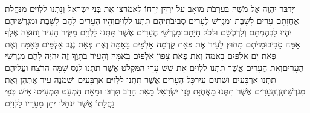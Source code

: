 \documentclass[../main/main.tex]{subfiles}
\begin{document}
\begin{multicols*}{\ncols}
וַיְדַבֵּר יַהְוֶה אֶל מֹשֶׁה בְּעַרְבֹת מוֹאָב עַל יַרְדֵּן יְרֵחוֹ לֵאמֹר\PreVerseSpace{}צַו אֶת בְּנֵי יִשְׂרָאֵל וְנָתְנוּ לַלְוִיִּם מִנַּחֲלַת אֲחֻזָּתָם עָרִים לָשָׁבֶת וּמִגְרָשׁ לֶעָרִים סְבִיבֹתֵיהֶם תִּתְּנוּ לַלְוִיִּם\PreVerseSpace{}וְהָיוּ הֶעָרִים לָהֶם לָשָׁבֶת וּמִגְרְשֵׁיהֶם יִהְיוּ לִבְהֶמְתָּם וְלִרְכֻשָׁם וּלְכֹל חַיָּתָם\PreVerseSpace{}וּמִגְרְשֵׁי הֶעָרִים אֲשֶׁר תִּתְּנוּ לַלְוִיִּם מִקִּיר הָעִיר וָחוּצָה אֶלֶף אַמָּה סָבִיב\PreVerseSpace{}וּמַדֹּתֶם מִחוּץ לָעִיר אֶת פְּאַת קֵדְמָה אַלְפַּיִם בָּאַמָּה וְאֶת פְּאַת נֶגֶב אַלְפַּיִם בָּאַמָּה וְאֶת פְּאַת יָם אַלְפַּיִם בָּאַמָּה וְאֵת פְּאַת צָפוֹן אַלְפַּיִם בָּאַמָּה וְהָעִיר בַּתָּוֶךְ זֶה יִהְיֶה לָהֶם מִגְרְשֵׁי הֶעָרִים\PreVerseSpace{}וְאֵת הֶעָרִים אֲשֶׁר תִּתְּנוּ לַלְוִיִּם אֵת שֵׁשׁ עָרֵי הַמִּקְלָט אֲשֶׁר תִּתְּנוּ לָנֻס שָׁמָּה הָרֹצֵחַ וַעֲלֵיהֶם תִּתְּנוּ אַרְבָּעִים וּשְׁתַּיִם עִיר\PreVerseSpace{}כָּל הֶעָרִים אֲשֶׁר תִּתְּנוּ לַלְוִיִּם אַרְבָּעִים וּשְׁמֹנֶה עִיר אֶתְהֶן וְאֶת מִגְרְשֵׁיהֶן\PreVerseSpace{}וְהֶעָרִים אֲשֶׁר תִּתְּנוּ מֵאֲחֻזַּת בְּנֵי יִשְׂרָאֵל מֵאֵת הָרַב תַּרְבּוּ וּמֵאֵת הַמְעַט תַּמְעִיטוּ אִישׁ כְּפִי נַחֲלָתוֹ אֲשֶׁר יִנְחָלוּ יִתֵּן מֵעָרָיו לַלְוִיִּם\OpenSection{}\par

\end{multicols*}
\end{document}
